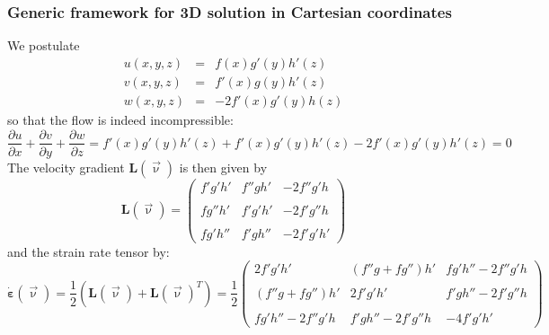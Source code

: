 \subsubsection{Generic framework for 3D solution in Cartesian coordinates}\label{ss:mms3Dgen}

We postulate
\begin{eqnarray}
u(x,y,z) &=& f(x) g'(y) h'(z) \\
v(x,y,z) &=& f'(x) g(y) h'(z) \\
w(x,y,z) &=& -2f'(x) g'(y) h(z) 
\end{eqnarray}
so that the flow is indeed incompressible: 
\[
\frac{\partial u}{\partial x}+
\frac{\partial v}{\partial y}+
\frac{\partial w}{\partial z}
=
f'(x) g'(y) h'(z) + f'(x) g'(y) h'(z) -2f'(x) g'(y) h'(z)
=0
\]
The velocity gradient ${\bm L}(\vec\upnu)$ is then given by
\[
{\bm L}(\vec\upnu) =
\left(
\begin{array}{ccc}
f'g'h' &  f'' g h' & -2f'' g' h \\ \\
fg''h' & f'g'h'    & -2f' g'' h \\ \\
fg'h'' & f'gh''    & -2f'g'h'
\end{array}
\right)
\]
and the strain rate tensor by:
\[
\dot{\bm \varepsilon}(\vec\upnu)
=\frac{1}{2}({\bm L}(\vec\upnu)+{\bm L}(\vec\upnu)^T)
=
\frac{1}{2}
\left(
\begin{array}{ccc}
2f'g'h' & (f'' g+fg'') h'  & fg'h''-2f'' g' h \\ \\
(f''g+fg'')h' & 2f'g'h'    & f'gh''-2f' g'' h \\ \\
fg'h'' -2f'' g' h & f'gh'' -2f' g'' h    & -4f'g'h'
\end{array}
\right)
\]

